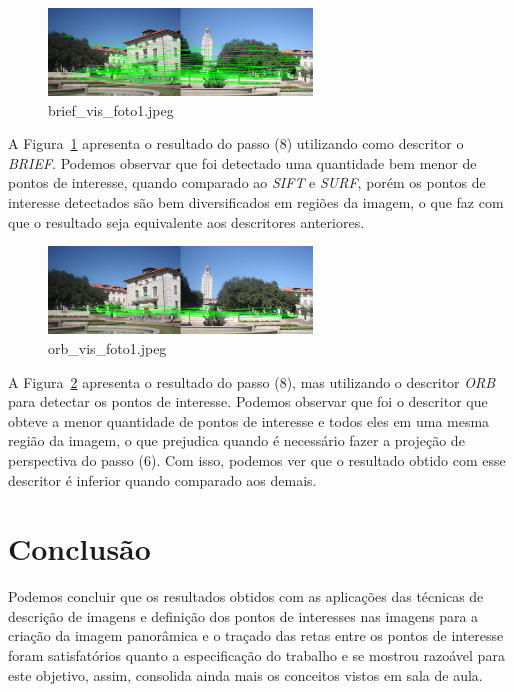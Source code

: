 \documentclass[twoside,twocolumn]{article}
\begin{document}
\begin{figure}[H]
\begin{center}
	\includegraphics[width=7cm]{figures/brief_vis_foto1.jpeg}
\caption{brief\_vis\_foto1.jpeg} \label{brief_vis_foto1}
\end{center}
\end{figure}

A Figura~\ref{brief_vis_foto1} apresenta o resultado do passo (8) utilizando como descritor o \textit{BRIEF}. Podemos observar que foi detectado uma quantidade bem menor de pontos de interesse, quando comparado ao \textit{SIFT} e \textit{SURF}, porém os pontos de interesse detectados são bem diversificados em regiões da imagem, o que faz com que o resultado seja equivalente aos descritores anteriores.

\begin{figure}[H]
\begin{center}
	\includegraphics[width=7cm]{figures/orb_vis_foto1.jpeg}
\caption{orb\_vis\_foto1.jpeg} \label{orb_vis_foto1}
\end{center}
\end{figure}

A Figura~\ref{orb_vis_foto1} apresenta o resultado do passo (8), mas utilizando o descritor \textit{ORB} para detectar os pontos de interesse. Podemos observar que foi o descritor que obteve a menor quantidade de pontos de interesse e todos eles em uma mesma região da imagem, o que prejudica quando é necessário fazer a projeção de perspectiva do passo (6). Com isso, podemos ver que o resultado obtido com esse descritor é inferior quando comparado aos demais.


\section{Conclusão}

Podemos concluir que os resultados obtidos com as aplicações das técnicas de descrição de imagens e definição dos pontos de interesses nas imagens para a criação da imagem panorâmica e o traçado das retas entre os pontos de interesse foram satisfatórios quanto a especificação do trabalho e se mostrou razoável para este objetivo, assim, consolida ainda mais os conceitos vistos em sala de aula.
\end{document}
